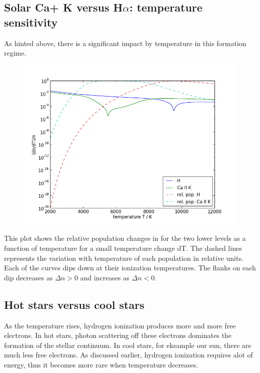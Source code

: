 \documentclass[norsk,a4paper,12pt]{article}
\begin{document}
\subsection{Solar Ca+ K versus H$\alpha$: temperature sensitivity}

As hinted above, there is a significant impact by temperature in this formation regime. 

\begin{figure}[H] 
\begin{center} 
\includegraphics[scale=0.5]{ssa28_2.png} 
 

\caption{} 
\end{center} 
\end{figure}


This plot shows the relative population changes in for the two lower levels as a function of temperature for a small 
temperature change dT. The dashed lines represents the variation with temperature of each population in relative units.
Each of the curves dips down at their ionization temperatures. The flanks on each dip decreases as $ \Delta n > 0$ and 
increases as $ \Delta n < 0$. 

\subsection{Hot stars versus cool stars}

As the temperature rises, hydrogen ionization produces more and more free electrons. In hot stars, photon scattering
off these electrons dominates the formation of the stellar continuum. In cool stars, for eksample our sun, there are 
much less free electrons. As discussed earlier, hydrogen ionization requires alot of energy, thus it becomes more rare 
when temperature decreases. 
\end{document}
